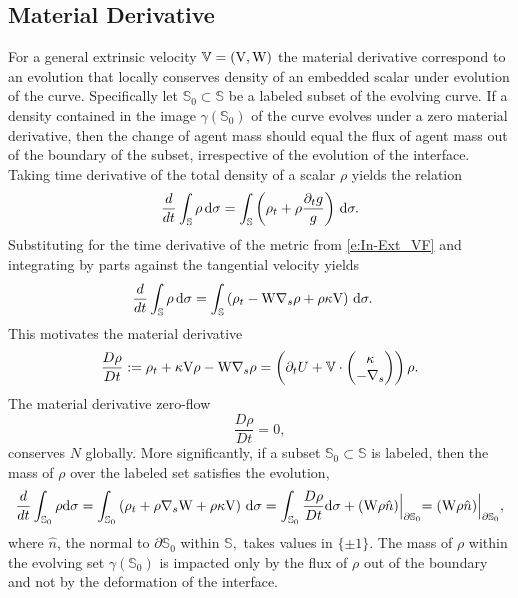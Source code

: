 \documentclass[11pt]{amsart}
\theoremstyle{plain}
\newcommand{\beq}{\begin{equation}}
\newcommand{\eeq}{\end{equation}}
\def\mbbS{\mathbb{S}}
\def\mbbV{\mathbb{V}}
\def\mrV{\textrm V}
\def\mrW{\textrm W}
\def\mrd{\textrm d}
\def\bpm{\begin{pmatrix}}
\def\epm{\end{pmatrix}}
\def\rmd{\mathrm d}
\numberwithin{equation}{section}
\theoremstyle{plain}
\begin{document}
\subsection{Material Derivative}For a general extrinsic velocity $\mbbV=(\mrV,\mrW)$ the material derivative correspond to an evolution that locally conserves density of an embedded scalar under evolution of the curve.  Specifically let $\mbbS_0\subset\mbbS$ be a labeled subset of the evolving curve. If a density contained in the image $\gamma(\mbbS_0)$ of the curve evolves under a zero material derivative, then the change of agent mass should equal the flux of agent mass out of the boundary of the subset, irrespective of the evolution of the interface.
Taking time derivative of the total density of a scalar $\rho$ yields the relation
$$
    \frac{d}{dt}\int_\mbbS \rho\,\mrd \sigma  = \int_\mbbS \left(\rho_t +\rho\frac{\partial_t g}{g}\right)\,\rmd \sigma.
$$
Substituting for the time derivative of the metric from \eqref{e:In-Ext_VF} and integrating by parts against the tangential velocity yields
$$ \begin{aligned}
  \frac{d}{dt}\int_\mbbS \rho\,\mrd \sigma 
    &= \int_\mbbS \left(\rho_t -\mrW \nabla_s\rho  +\rho\kappa \mrV \right)\,\rmd\sigma.
    \end{aligned} $$
This motivates the material derivative
\beq
\label{e:MD}
\frac{D\rho}{Dt}:= 
\rho_t+\kappa\mrV\rho -\mrW\nabla_s \rho=\left(\partial_t U+ \mbbV\cdot \bpm \kappa \cr -\nabla_s\epm\right) \rho.
\eeq
The material derivative zero-flow
\beq\label{e:MD-flow} \frac{D\rho}{Dt}=0,
\eeq
conserves $N$ globally. More significantly,  if a subset $\mbbS_0\subset \mbbS$ is labeled, then the mass of $\rho$ over the labeled set satisfies the evolution,
$$ \frac{d}{dt}\int_{\mbbS_0} \rho \rmd\sigma =
 \int_{\mbbS_0} \left(\rho_t +\rho \nabla_s \mrW +\rho\kappa \mrV \right)\,\rmd\sigma=
\int_{\mbbS_0} \frac{D\rho}{Dt} \rmd\sigma +(\mrW \rho \hat n)\Bigl|_{\partial\mbbS_0}= (\mrW \rho \hat n)\Bigl|_{\partial\mbbS_0},$$
where $\hat n$, the normal to $\partial\mbbS_0$ within $\mbbS,$  takes values in $\{\pm1\}$. The mass of $\rho$ within the evolving set $\gamma(\mbbS_0)$ is impacted only by the flux of $\rho$ out of the boundary and not by the deformation of the interface.
\end{document}

